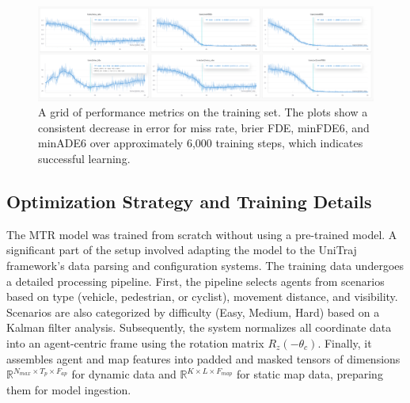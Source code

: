 \begin{figure}[htbp]
    \centering
    \includegraphics[width=\textwidth]{figures/performance_metrics_training.png}
    \caption{A grid of performance metrics on the training set. The plots show a consistent decrease in error for miss rate, brier FDE, minFDE6, and minADE6 over approximately 6,000 training steps, which indicates successful learning.}
    \label{fig:training_metrics_grid}
\end{figure}

\subsection{Optimization Strategy and Training Details}
\label{sec:model_optimization_details}
The MTR model was trained from scratch without using a pre-trained model. A significant part of the setup involved adapting the model to the UniTraj framework's data parsing and configuration systems. The training data undergoes a detailed processing pipeline. First, the pipeline selects agents from scenarios based on type (vehicle, pedestrian, or cyclist), movement distance, and visibility. Scenarios are also categorized by difficulty (Easy, Medium, Hard) based on a Kalman filter analysis. Subsequently, the system normalizes all coordinate data into an agent-centric frame using the rotation matrix $R_{z}(-\theta_{c})$. Finally, it assembles agent and map features into padded and masked tensors of dimensions $\mathbb{R}^{N_{max}\times T_{p}\times F_{ap}}$ for dynamic data and $\mathbb{R}^{K\times L\times F_{map}}$ for static map data, preparing them for model ingestion.
